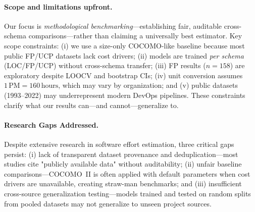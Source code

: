 \documentclass{ieeeaccess}
\begin{document}
\paragraph{Scope and limitations upfront.}
Our focus is \emph{methodological benchmarking}---establishing fair, auditable cross-schema comparisons---rather than claiming a universally best estimator.
Key scope constraints:
(i) we use a size-only COCOMO-like baseline because most public FP/UCP datasets lack cost drivers;
(ii) models are trained \emph{per schema} (LOC/FP/UCP) without cross-schema transfer;
(iii) FP results ($n{=}158$) are exploratory despite LOOCV and bootstrap CIs;
(iv) unit conversion assumes $1\,\text{PM}{=}160\,\text{hours}$, which may vary by organization; and
(v) public datasets (1993--2022) may underrepresent modern DevOps pipelines.
These constraints clarify what our results can---and cannot---generalize to.

\paragraph{Research Gaps Addressed.}
Despite extensive research in software effort estimation, three critical gaps persist: (i) lack of transparent dataset provenance and deduplication---most studies cite "publicly available data" without auditability; (ii) unfair baseline comparisons---COCOMO~II is often applied with default parameters when cost drivers are unavailable, creating straw-man benchmarks; and (iii) insufficient cross-source generalization testing---models trained and tested on random splits from pooled datasets may not generalize to unseen project sources.
\end{document}
